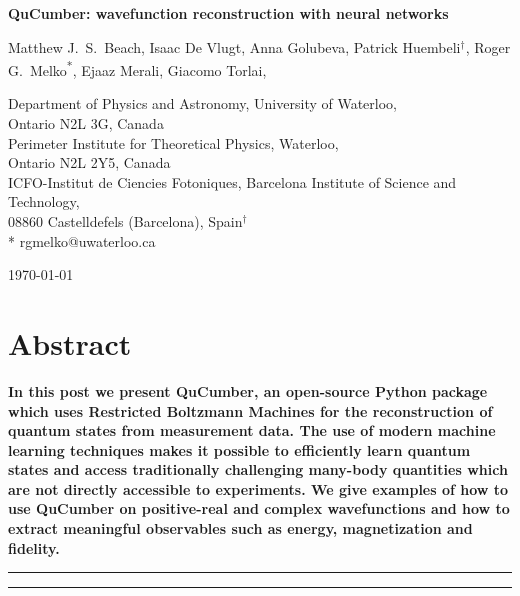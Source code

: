 \documentclass[submission, Phys]{SciPost}
\begin{document}
\begin{center}{\Large \textbf{
			QuCumber: wavefunction reconstruction with neural networks
		}}\end{center}

\begin{center}
	Matthew J.~S.~Beach,
	Isaac De Vlugt,
	Anna Golubeva,
	Patrick Huembeli$^\dag$,
	Roger G.~Melko\textsuperscript{*},
	Ejaaz Merali,
	Giacomo Torlai,
\end{center}

\begin{center}
	Department of Physics and Astronomy, University of Waterloo,
	\\Ontario N2L 3G, Canada
	\\
	Perimeter Institute for Theoretical Physics, Waterloo,
	\\Ontario N2L 2Y5, Canada
	\\
	ICFO-Institut de Ciencies Fotoniques, Barcelona Institute of Science and Technology,
	\\08860 Castelldefels (Barcelona), Spain$^\dag$ \\
	* rgmelko@uwaterloo.ca \\
\end{center}

\begin{center}
	\today
\end{center}


\section*{Abstract}
{\bf
	In this post we present QuCumber, an open-source Python package which uses Restricted Boltzmann Machines for the reconstruction of quantum states from measurement data. 
    The use of modern machine learning techniques makes it possible to efficiently learn quantum states and access traditionally challenging many-body quantities which are not directly accessible to experiments. 
    We give examples of how to use QuCumber on positive-real and complex wavefunctions and how to extract meaningful observables such as energy, magnetization and fidelity.
}

\vspace{10pt}
\noindent\rule{\textwidth}{1pt}
\tableofcontents\thispagestyle{fancy}
\noindent\rule{\textwidth}{1pt}
\vspace{10pt}
\end{document}
